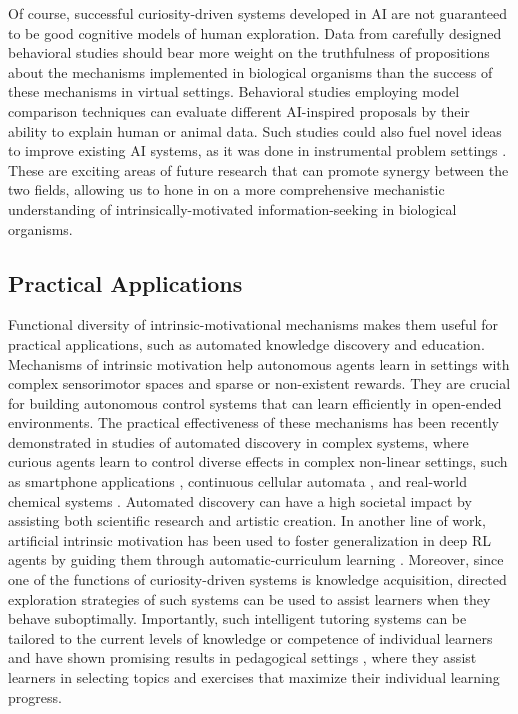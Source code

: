 Of course, successful curiosity-driven systems developed in AI are not guaranteed to be good cognitive models of human exploration. Data from carefully designed behavioral studies should bear more weight on the truthfulness of propositions about the mechanisms implemented in biological organisms than the success of these mechanisms in virtual settings. Behavioral studies employing model comparison techniques \parencite[e.g.,][]{poli_infants_2020,ten_humans_2021} can evaluate different AI-inspired proposals by their ability to explain human or animal data. Such studies could also fuel novel ideas to improve existing AI systems, as it was done in instrumental problem settings \parencite{lin_story_2020}. These are exciting areas of future research that can promote synergy between the two fields, allowing us to hone in on a more comprehensive mechanistic understanding of intrinsically-motivated information-seeking in biological organisms.
    
\subsection{Practical Applications}\label{CH3_SS_practical_applications}
Functional diversity of intrinsic-motivational mechanisms makes them useful for practical applications, such as automated knowledge discovery and education. Mechanisms of intrinsic motivation help autonomous agents learn in settings with complex sensorimotor spaces and sparse or non-existent rewards. They are crucial for building autonomous control systems that can learn efficiently in open-ended environments. The practical effectiveness of these mechanisms has been recently demonstrated in studies of automated discovery in complex systems, where curious agents learn to control diverse effects in complex non-linear settings, such as smartphone applications \parencite{pan_reinforcement_2020}, continuous cellular automata \parencite{etcheverry_hierarchically_2021}, and real-world chemical systems \parencite{grizou_curious_2020}. Automated discovery can have a high societal impact by assisting both scientific research and artistic creation. In another line of work, artificial intrinsic motivation has been used to foster generalization in deep \ac{RL} agents by guiding them through automatic-curriculum learning \parencite{portelas_automatic_2020}. Moreover, since one of the functions of curiosity-driven systems is knowledge acquisition, directed exploration strategies of such systems can be used to assist learners when they behave suboptimally. Importantly, such intelligent tutoring systems can be tailored to the current levels of knowledge or competence of individual learners \parencite{clement_comparison_2016} and have shown promising results in pedagogical settings \parencite{clement_multi-armed_2015,delmas_fostering_2018}, where they assist learners in selecting topics and exercises that maximize their individual learning progress.

